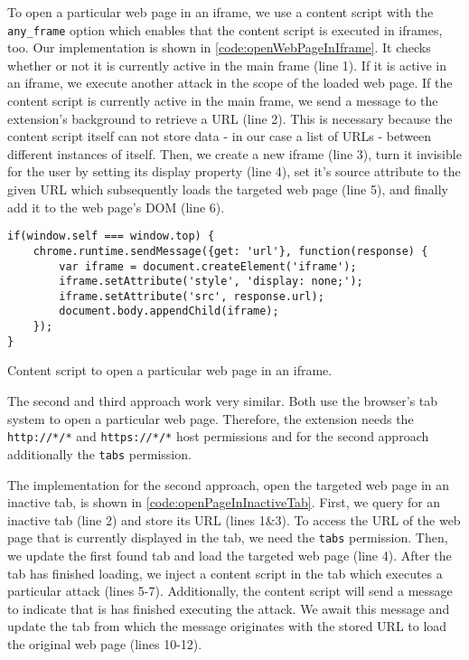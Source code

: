 	To open a particular web page in an iframe, we use a content script with the \texttt{any\_frame} option which enables that the content script is executed in iframes, too. Our implementation is shown in \autoref{code:openWebPageInIframe}. It checks whether or not it is currently active in the main frame (line 1). If it is active in an iframe, we execute another attack in the scope of the loaded web page. If the content script is currently active in the main frame, we send a message to the extension's background to retrieve a URL (line 2). This is necessary because the content script itself can not store data - in our case a list of URLs - between different instances of itself. Then, we create a new iframe (line 3), turn it invisible for the user by setting its display property (line 4), set it's source attribute to the given URL which subsequently loads the targeted web page (line 5), and finally add it to the web page's DOM (line 6). 
	
	\begin{code}
		\begin{lstlisting}
if(window.self === window.top) {
	chrome.runtime.sendMessage({get: 'url'}, function(response) {
		var iframe = document.createElement('iframe');
		iframe.setAttribute('style', 'display: none;');
		iframe.setAttribute('src', response.url);
		document.body.appendChild(iframe);
	});
}
\end{lstlisting}
		\caption{Content script to open a particular web page in an iframe.}
		\label{code:openWebPageInIframe}
	\end{code}
	
	The second and third approach work very similar. Both use the browser's tab system to open a particular web page. Therefore, the extension needs the \texttt{http://*/*} and \texttt{https://*/*} host permissions and for the second approach additionally the \texttt{tabs} permission. 
	
	The implementation for the second approach, open the targeted web page in an inactive tab, is shown in \autoref{code:openPageInInactiveTab}. First, we query for an inactive tab (line 2) and store its URL (lines 1\&3). To access the URL of the web page that is currently displayed in the tab, we need the \texttt{tabs} permission. Then, we update the first found tab and load the targeted web page (line 4). After the tab has finished loading, we inject a content script in the tab which executes a particular attack (lines 5-7). Additionally, the content script will send a message to indicate that is has finished executing the attack. We await this message and update the tab from which the message originates with the stored URL to load the original web page (lines 10-12).
		
